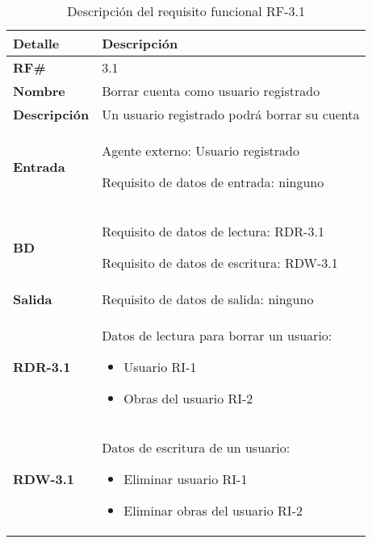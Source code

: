 \begin{table}[H]
    \centering
    \begin{tabular}{|p{3cm}|p{8cm}|}
        \hline
        \rowcolor{lightgray}
        \textbf{Detalle} & \textbf{Descripción} \\
        \hline
        \textbf{RF\#} & 3.1 \\
        \hline
        \textbf{Nombre} & Borrar cuenta como usuario registrado \\
        \hline
        \textbf{Descripción} & Un usuario registrado podrá borrar su cuenta \\
        \hline
        \textbf{Entrada} &
        Agente externo: Usuario registrado
        
        Requisito de datos de entrada: ninguno \\
        \hline
        \textbf{BD} &
        Requisito de datos de lectura: RDR-3.1
        
        Requisito de datos de escritura: RDW-3.1 \\
        \hline
        \textbf{Salida} & Requisito de datos de salida: ninguno \\
        \hline
        \textbf{RDR-3.1} & Datos de lectura para borrar un usuario:
            \begin{itemize}
                \item Usuario RI-1
                \item Obras del usuario RI-2
            \end{itemize} \\
        \hline
        \textbf{RDW-3.1} & Datos de escritura de un usuario:
            \begin{itemize}
                \item Eliminar usuario RI-1
                \item Eliminar obras del usuario RI-2
            \end{itemize} \\
        \hline
    \end{tabular}
    \caption{Descripción del requisito funcional RF-3.1}
    \label{tab:rf-3-1}
\end{table}

